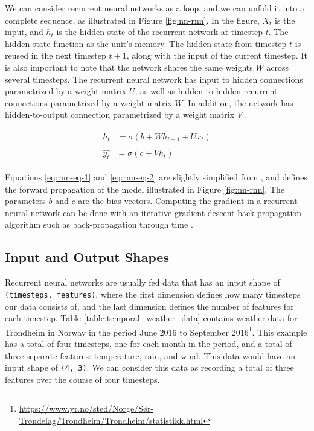 We can consider recurrent neural networks as a loop, and we can unfold it into a complete sequence, as illustrated in Figure \ref{fig:nn-rnn}. In the figure, \(X_{t}\) is the input, and \(h_{t}\) is the hidden state of the recurrent network at timestep \(t\). The hidden state function as the unit's memory. The hidden state from timestep \(t\) is reused in the next timestep \(t+1\), along with the input of the current timestep. It is also important to note that the network shares the same weights \(W\) across several timesteps. The recurrent neural network has input to hidden connections parametrized by a weight matrix \(U\), as well as hidden-to-hidden recurrent connections parametrized by a weight matrix \(W\). In addition, the network has hidden-to-output connection parametrized by a weight matrix \(V\) \citep{goodfellow2016deeplearning}.

\begin{align}
    \begin{split}\label{eq:rnn-eq-1}
        h_{t}&=\sigma(b+Wh_{t-1}+Ux_{t})
    \end{split}\\
    \begin{split}\label{eq:rnn-eq-2}
        \hat{y_{t}}&=\sigma(c+Vh_{t})
    \end{split}
\end{align}

Equations \ref{eq:rnn-eq-1} and \ref{eq:rnn-eq-2} are slightly simplified from \cite{goodfellow2016deeplearning}, and defines the forward propagation of the model illustrated in Figure \ref{fig:nn-rnn}. The parameters \(b\) and \(c\) are the bias vectors. Computing the gradient in a recurrent neural network can be done with an iterative gradient descent back-propagation algorithm such as back-propagation through time \citep{werbos1990backpropagation, rumelhart1988learning}. 

\subsection{Input and Output Shapes}
\label{sec:input_and_output_shapes}
Recurrent neural networks are usually fed data that has an input shape of {\tt (timesteps, features)}, where the first dimension defines how many timesteps our data consists of, and the last dimension defines the number of features for each timestep. Table \ref{table:temporal_weather_data} contains weather data for Trondheim in Norway in the period June 2016 to September 2016\footnote{\url{https://www.yr.no/sted/Norge/Sør-Trøndelag/Trondheim/Trondheim/statistikk.html}}. This example has a total of four timesteps, one for each month in the period, and a total of three separate features: temperature, rain, and wind. This data would have an input shape of {\tt (4, 3)}. We can consider this data as recording a total of three features over the course of four timesteps.

